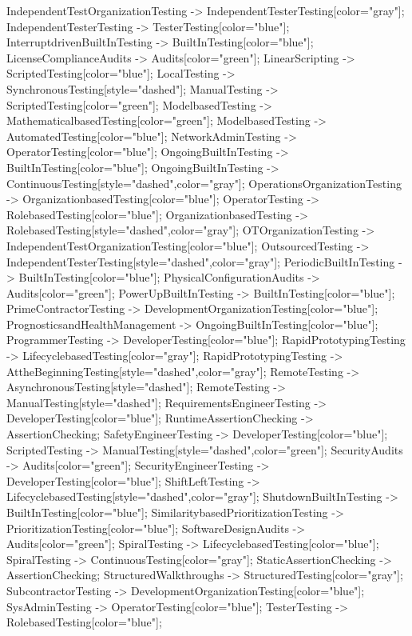 \documentclass{article}
\begin{document}
{IndependentTestOrganizationTesting -> IndependentTesterTesting[color="gray"];
IndependentTesterTesting -> TesterTesting[color="blue"];
InterruptdrivenBuiltInTesting -> BuiltInTesting[color="blue"];
LicenseComplianceAudits -> Audits[color="green"];
LinearScripting -> ScriptedTesting[color="blue"];
LocalTesting -> SynchronousTesting[style="dashed"];
ManualTesting -> ScriptedTesting[color="green"];
ModelbasedTesting -> MathematicalbasedTesting[color="green"];
ModelbasedTesting -> AutomatedTesting[color="blue"];
NetworkAdminTesting -> OperatorTesting[color="blue"];
OngoingBuiltInTesting -> BuiltInTesting[color="blue"];
OngoingBuiltInTesting -> ContinuousTesting[style="dashed",color="gray"];
OperationsOrganizationTesting -> OrganizationbasedTesting[color="blue"];
OperatorTesting -> RolebasedTesting[color="blue"];
OrganizationbasedTesting -> RolebasedTesting[style="dashed",color="gray"];
OTOrganizationTesting -> IndependentTestOrganizationTesting[color="blue"];
OutsourcedTesting -> IndependentTesterTesting[style="dashed",color="gray"];
PeriodicBuiltInTesting -> BuiltInTesting[color="blue"];
PhysicalConfigurationAudits -> Audits[color="green"];
PowerUpBuiltInTesting -> BuiltInTesting[color="blue"];
PrimeContractorTesting -> DevelopmentOrganizationTesting[color="blue"];
PrognosticsandHealthManagement -> OngoingBuiltInTesting[color="blue"];
ProgrammerTesting -> DeveloperTesting[color="blue"];
RapidPrototypingTesting -> LifecyclebasedTesting[color="gray"];
RapidPrototypingTesting -> AttheBeginningTesting[style="dashed",color="gray"];
RemoteTesting -> AsynchronousTesting[style="dashed"];
RemoteTesting -> ManualTesting[style="dashed"];
RequirementsEngineerTesting -> DeveloperTesting[color="blue"];
RuntimeAssertionChecking -> AssertionChecking;
SafetyEngineerTesting -> DeveloperTesting[color="blue"];
ScriptedTesting -> ManualTesting[style="dashed",color="green"];
SecurityAudits -> Audits[color="green"];
SecurityEngineerTesting -> DeveloperTesting[color="blue"];
ShiftLeftTesting -> LifecyclebasedTesting[style="dashed",color="gray"];
ShutdownBuiltInTesting -> BuiltInTesting[color="blue"];
SimilaritybasedPrioritizationTesting -> PrioritizationTesting[color="blue"];
SoftwareDesignAudits -> Audits[color="green"];
SpiralTesting -> LifecyclebasedTesting[color="blue"];
SpiralTesting -> ContinuousTesting[color="gray"];
StaticAssertionChecking -> AssertionChecking;
StructuredWalkthroughs -> StructuredTesting[color="gray"];
SubcontractorTesting -> DevelopmentOrganizationTesting[color="blue"];
SysAdminTesting -> OperatorTesting[color="blue"];
TesterTesting -> RolebasedTesting[color="blue"];
}
\end{document}
